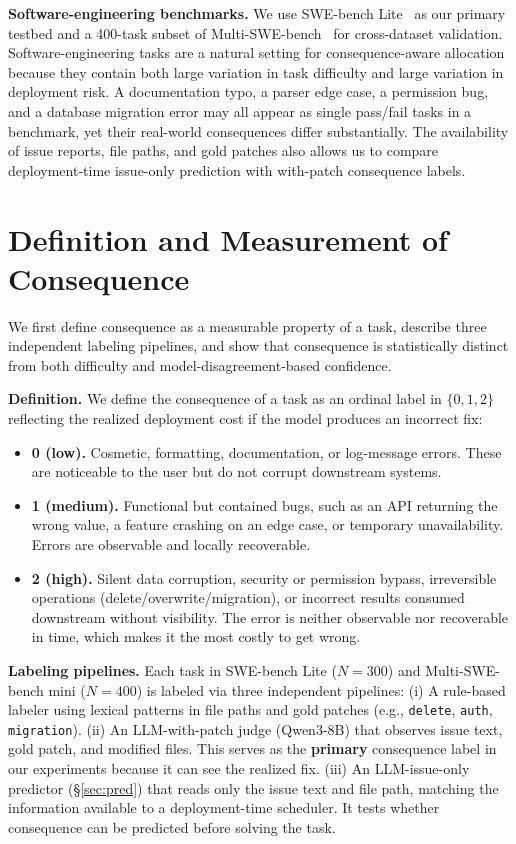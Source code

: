 \documentclass{article}
\begin{document}
\textbf{Software-engineering benchmarks.}
We use SWE-bench Lite~\citep{jimenez2023swebench} as our primary testbed and a 400-task subset of Multi-SWE-bench~\citep{ma2024multiswebench}
for cross-dataset validation. Software-engineering tasks are a natural setting for consequence-aware allocation because they contain both large variation in task difficulty and large variation in deployment
risk. A documentation typo, a parser edge case, a permission bug, and a database migration error may all appear as single pass/fail tasks in a benchmark, yet their real-world consequences differ substantially.
The availability of issue reports, file paths, and gold patches also allows us to compare deployment-time issue-only prediction with with-patch consequence labels.

\section{Definition and Measurement of Consequence}
\label{sec:cons}

We first define consequence as a measurable property of a task, describe three independent labeling pipelines, and show that consequence is statistically distinct from both difficulty and model-disagreement-based confidence.

\textbf{Definition.} We define the consequence of a task as an ordinal label in $\{0, 1, 2\}$ reflecting the realized deployment cost if the model produces an incorrect fix:
\begin{itemize}\itemsep0pt
  \item \textbf{0 (low).} Cosmetic, formatting, documentation, or log-message errors. These are noticeable to the user but do not corrupt downstream systems.
  \item \textbf{1 (medium).} Functional but contained bugs, such as an API returning the wrong value, a feature crashing on an edge case, or temporary unavailability. Errors are observable and locally recoverable.
  \item \textbf{2 (high).} Silent data corruption, security or permission bypass, irreversible operations (delete/overwrite/migration), or incorrect results consumed downstream without visibility. The error is neither observable nor recoverable in time, which makes it the most costly to get wrong.
\end{itemize}

\textbf{Labeling pipelines.} Each task in SWE-bench Lite ($N{=}300$) and Multi-SWE-bench mini ($N{=}400$) is labeled via three independent pipelines:
(i) A rule-based labeler using lexical patterns in file paths and gold patches (e.g., \texttt{delete}, \texttt{auth}, \texttt{migration}).
(ii) An LLM-with-patch judge (Qwen3-8B) that observes issue text, gold patch, and modified files. This serves as the \textbf{primary} consequence label in our experiments because it can see the realized fix.
(iii) An LLM-issue-only predictor (\S\ref{sec:pred}) that reads only the issue text and file path, matching the information available to a deployment-time scheduler. It tests whether consequence can be predicted before solving the task.
\end{document}
